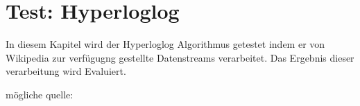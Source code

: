 \section{Test: Hyperloglog}
In diesem Kapitel wird der Hyperloglog Algorithmus getestet indem er von Wikipedia zur verfügugng gestellte Datenstreams verarbeitet. Das Ergebnis dieser verarbeitung wird Evaluiert. 

mögliche quelle: \cite{flajolet2007}